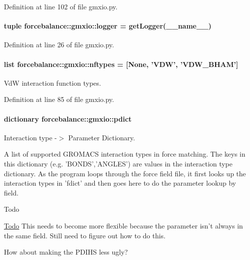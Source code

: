 \-Definition at line 102 of file gmxio.\-py.

\hypertarget{namespaceforcebalance_1_1gmxio_a1ba0eaad8ffef47e3afff245dd1e3dcf}{
\paragraph[{logger}]{\setlength{\rightskip}{0pt plus 5cm}tuple {\bf forcebalance\-::gmxio\-::logger} = get\-Logger(\-\_\-\-\_\-name\-\_\-\-\_\-)}}\label{namespaceforcebalance_1_1gmxio_a1ba0eaad8ffef47e3afff245dd1e3dcf}


\-Definition at line 26 of file gmxio.\-py.

\hypertarget{namespaceforcebalance_1_1gmxio_a1273a5830d780475a2d07385c60341f6}{
\paragraph[{nftypes}]{\setlength{\rightskip}{0pt plus 5cm}list {\bf forcebalance\-::gmxio\-::nftypes} = \mbox{[}\-None, '\-V\-D\-W', '\-V\-D\-W\-\_\-\-B\-H\-A\-M'\mbox{]}}}\label{namespaceforcebalance_1_1gmxio_a1273a5830d780475a2d07385c60341f6}


\-Vd\-W interaction function types. 



\-Definition at line 85 of file gmxio.\-py.

\hypertarget{namespaceforcebalance_1_1gmxio_afa3ee5e262ff005d87d20b4ec1581bad}{
\paragraph[{pdict}]{\setlength{\rightskip}{0pt plus 5cm}dictionary {\bf forcebalance\-::gmxio\-::pdict}}}\label{namespaceforcebalance_1_1gmxio_afa3ee5e262ff005d87d20b4ec1581bad}


\-Interaction type -\/$>$ \-Parameter \-Dictionary. 

\-A list of supported \-G\-R\-O\-M\-A\-C\-S interaction types in force matching. \-The keys in this dictionary (e.\-g. '\-B\-O\-N\-D\-S','\-A\-N\-G\-L\-E\-S') are values in the interaction type dictionary. \-As the program loops through the force field file, it first looks up the interaction types in 'fdict' and then goes here to do the parameter lookup by field. \begin{DoxyRefDesc}{\-Todo}
\item[\hyperlink{todo__todo000010}{\-Todo}]\-This needs to become more flexible because the parameter isn't always in the same field. \-Still need to figure out how to do this. 

\-How about making the \-P\-D\-I\-H\-S less ugly? \end{DoxyRefDesc}


